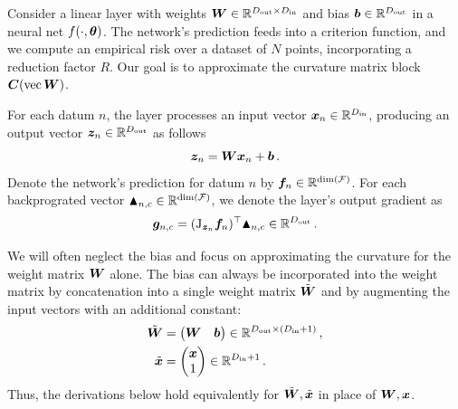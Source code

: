 \begin{setup}\label{setup:linear_layer}
  Consider a linear layer with weights ${\bm{W}} \in {\mathbb{R}}^{D_{\text{out}}\times D_{\text{in}}}$ and bias ${\bm{b}} \in {\mathbb{R}}^{D_{\text{out}}}$ in a neural net $f(\cdot, {\bm{\theta}})$.
  The network's prediction feeds into a criterion function, and we compute an empirical risk over a dataset of $N$ points, incorporating a reduction factor $R$.
  Our goal is to approximate the curvature matrix block ${\bm{C}}(\operatorname{vec} {\bm{W}})$.

  For each datum $n$, the layer processes an input vector ${\bm{x}}_n \in {\mathbb{R}}^{D_{\text{in}}}$, producing an output vector ${\bm{z}}_{n} \in {\mathbb{R}}^{D_{\text{out}}}$ as follows
  $$ {\bm{z}}_{n} = {\bm{W}} {\bm{x}}_{n} + {\bm{b}}\,.$$
  Denote the network's prediction for datum $n$ by ${\bm{f}}_n \in {\mathbb{R}}^{\dim({\mathcal{F}})}$.
  For each backprograted vector $\blacktriangle_{n,c} \in {\mathbb{R}}^{\dim({\mathcal{F}})}$, we denote the layer's output gradient as
  $${\bm{g}}_{n,c} = (\mathrm{J}_{{\bm{z}}_{n}} {\bm{f}}_n)^{\top} \blacktriangle_{n,c} \in {\mathbb{R}}^{D_{\text{out}}}\,.$$

  We will often neglect the bias and focus on approximating the curvature for the weight matrix ${\bm{W}}$ alone.
  The bias can always be incorporated into the weight matrix by concatenation into a single weight matrix $\tilde{{\bm{W}}}$ and by augmenting the input vectors with an additional constant:
  \begin{align*}
    \tilde{{\bm{W}}} &= \begin{pmatrix} {\bm{W}} & {\bm{b}} \end{pmatrix} \in {\mathbb{R}}^{D_{\text{out}} \times (D_{\text{in}} + 1)}\,, \\
    \tilde{{\bm{x}}} &= \begin{pmatrix} {\bm{x}} \\ 1 \end{pmatrix} \in {\mathbb{R}}^{D_{\text{in}} + 1}\,.
  \end{align*}
  Thus, the derivations below hold equivalently for $\tilde{{\bm{W}}}, \tilde{{\bm{x}}}$ in place of ${\bm{W}}, {\bm{x}}$.
\end{setup}



